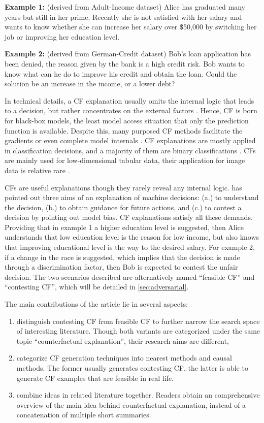 \noindent \textbf{Example 1:} \label{a}(derived from Adult-Income dataset) Alice has graduated many years but still in her prime. Recently she is not satisfied with her salary and wants to know whether she can increase her salary over \$50,000 by switching her job or improving her education level.

\noindent \textbf{Example 2:} \label{b}(derived from German-Credit dataset) Bob's loan application has been denied, the reason given by the bank is a high credit risk. Bob wants to know what can he do to improve his credit and obtain the loan. Could the solution be an increase in the income, or a lower debt?

In technical details, a CF explanation usually omits the internal logic that leads to a decision, but rather concentrates on the external factors \cite{watcher2017}. Hence, CF is born for black-box models, the least model access situation that only the prediction function is available. Despite this, many purposed CF methods facilitate the gradients or even complete model internals \cite{CFReview}. CF explanations are mostly applied in classification decisions, and a majority of them are binary classifications \cite{CFandAE}. CFs are mainly used for low-dimensional tabular data, their application for image data is relative rare \cite{CFandAE}.

CFs are useful explanations though they rarely reveal any internal logic. \citeauthor{watcher2017} \cite{watcher2017} has pointed out three aims of an explanation of machine decisions: (a.) to understand the decision, (b.) to obtain guidance for future actions, and (c.) to contest a decision by pointing out model bias. CF explanations satisfy all these demands. Providing that in example 1 a higher education level is suggested, then Alice understands that low education level is the reason for low income, but also knows that improving educational level is the way to the desired salary. For example 2, if a change in the race is suggested, which implies that the decision is made through a discrimination factor, then Bob is expected to contest the unfair decision. The two scenarios described are alternatively named ``feasible CF'' and ``contesting CF'', which will be detailed in \autoref{sec:adversarial}.

The main contributions of the article lie in several aspects:
\begin{enumerate}
  \item distinguish contesting CF from feasible CF to further narrow the search space of interesting literature. Though both variants are categorized under the same topic ``counterfactual explanation'', their research aims are different,
  \item categorize CF generation techniques into nearest methods and causal methods. The former usually generates contesting CF, the latter is able to generate CF examples that are feasible in real life.
  \item combine ideas in related literature together. Readers obtain an comprehensive overview of the main idea behind counterfactual explanation, instead of a concatenation of multiple short summaries.
\end{enumerate}  

